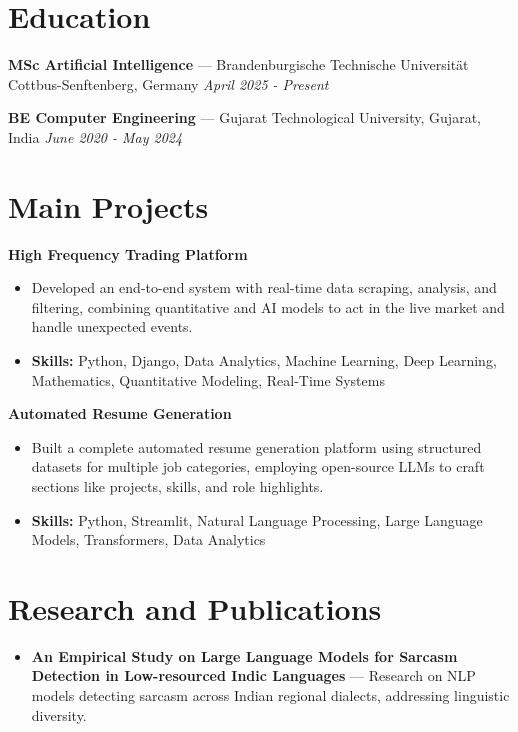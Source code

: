 \documentclass[a4paper,10pt]{article}
\begin{document}
\section*{Education}
\textbf{MSc Artificial Intelligence} — Brandenburgische Technische Universität Cottbus-Senftenberg, Germany \hfill \textit{April 2025 - Present}\par
\vspace{1.5pt}
\textbf{BE Computer Engineering} — Gujarat Technological University, Gujarat, India \hfill \textit{June 2020 - May 2024}\par

\section*{Main Projects}
\textbf{High Frequency Trading Platform}\par
\vspace{1pt}
\begin{itemize}
  \item Developed an end-to-end system with real-time data scraping, analysis, and filtering, combining quantitative and AI models to act in the live market and handle unexpected events.
  \item \textbf{Skills:} Python, Django, Data Analytics, Machine Learning, Deep Learning, Mathematics, Quantitative Modeling, Real-Time Systems
\end{itemize}
\vspace{3pt}
\textbf{Automated Resume Generation}\par
\vspace{1pt}
\begin{itemize}
  \item Built a complete automated resume generation platform using structured datasets for multiple job categories, employing open-source LLMs to craft sections like projects, skills, and role highlights.
  \item \textbf{Skills:} Python, Streamlit, Natural Language Processing, Large Language Models, Transformers, Data Analytics
\end{itemize}

\section*{Research and Publications}
\begin{itemize}
\item \textbf{An Empirical Study on Large Language Models for Sarcasm Detection in Low-resourced Indic Languages} — Research on NLP models detecting sarcasm across Indian regional dialects, addressing linguistic diversity.
\end{itemize}
\end{document}
